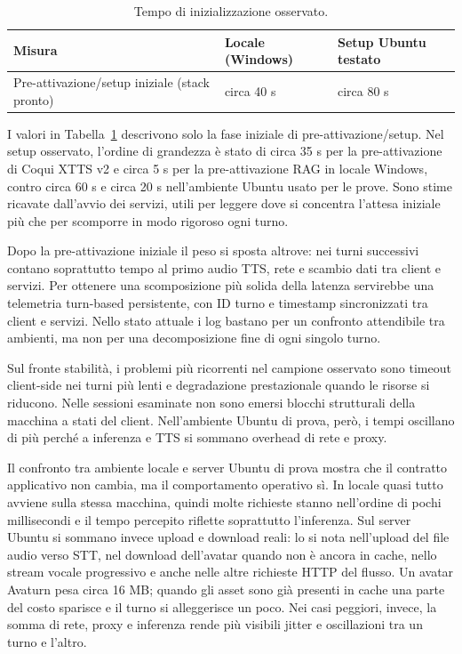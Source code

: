 \begin{table}[t]
\centering
\small
\begin{tabularx}{\linewidth}{l>{\centering\arraybackslash}X>{\centering\arraybackslash}X}
\hline
\textbf{Misura} & \textbf{Locale (Windows)} & \textbf{Setup Ubuntu testato} \\
\hline
Pre-attivazione/setup iniziale (stack pronto) & circa 40 s & circa 80 s \\
\hline
\end{tabularx}
\normalsize
\caption[Tempo di inizializzazione]{Tempo di inizializzazione osservato.}
\label{tab:cold-start-ready}
\end{table}

I valori in Tabella~\ref{tab:cold-start-ready} descrivono solo la fase iniziale di pre-attivazione/setup. Nel setup osservato, l'ordine di grandezza è stato di circa 35 s per la pre-attivazione di Coqui XTTS v2 e circa 5 s per la pre-attivazione RAG in locale Windows, contro circa 60 s e circa 20 s nell'ambiente Ubuntu usato per le prove. Sono stime ricavate dall'avvio dei servizi, utili per leggere dove si concentra l'attesa iniziale più che per scomporre in modo rigoroso ogni turno.

Dopo la pre-attivazione iniziale il peso si sposta altrove: nei turni successivi contano soprattutto tempo al primo audio TTS, rete e scambio dati tra client e servizi. Per ottenere una scomposizione più solida della latenza servirebbe una telemetria turn-based persistente, con ID turno e timestamp sincronizzati tra client e servizi. Nello stato attuale i log bastano per un confronto attendibile tra ambienti, ma non per una decomposizione fine di ogni singolo turno.

Sul fronte stabilità, i problemi più ricorrenti nel campione osservato sono timeout client-side nei turni più lenti e degradazione prestazionale quando le risorse si riducono. Nelle sessioni esaminate non sono emersi blocchi strutturali della macchina a stati del client. Nell'ambiente Ubuntu di prova, però, i tempi oscillano di più perché a inferenza e TTS si sommano overhead di rete e proxy.

Il confronto tra ambiente locale e server Ubuntu di prova mostra che il contratto applicativo non cambia, ma il comportamento operativo sì. In locale quasi tutto avviene sulla stessa macchina, quindi molte richieste stanno nell'ordine di pochi millisecondi e il tempo percepito riflette soprattutto l'inferenza. Sul server Ubuntu si sommano invece upload e download reali: lo si nota nell'upload del file audio verso STT, nel download dell'avatar quando non è ancora in cache, nello stream vocale progressivo e anche nelle altre richieste HTTP del flusso. Un avatar Avaturn pesa circa 16 MB; quando gli asset sono già presenti in cache una parte del costo sparisce e il turno si alleggerisce un poco. Nei casi peggiori, invece, la somma di rete, proxy e inferenza rende più visibili jitter e oscillazioni tra un turno e l'altro.

